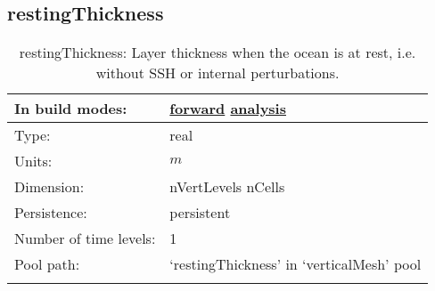 \subsection[restingThickness]{restingThickness}
\label{subsec:var_sec_verticalMesh_restingThickness}
\begin{center}
\begin{longtable}{| p{2.0in} | p{4.0in} |}
        \hline 
        In build modes: & \hyperref[subsec:forward_var_tab_verticalMesh]{forward} \hyperref[subsec:analysis_var_tab_verticalMesh]{analysis} \\
        \hline 
        Type: & real \\
        \hline 
        Units: & $m$ \\
        \hline 
        Dimension: & nVertLevels nCells \\
        \hline 
        Persistence: & persistent \\
        \hline 
        Number of time levels: & 1 \\
        \hline 
            Pool path: & `restingThickness' in `verticalMesh' pool \\
		 \hline 
    \caption{restingThickness: Layer thickness when the ocean is at rest, i.e. without SSH or internal perturbations.}
\end{longtable}
\end{center}
